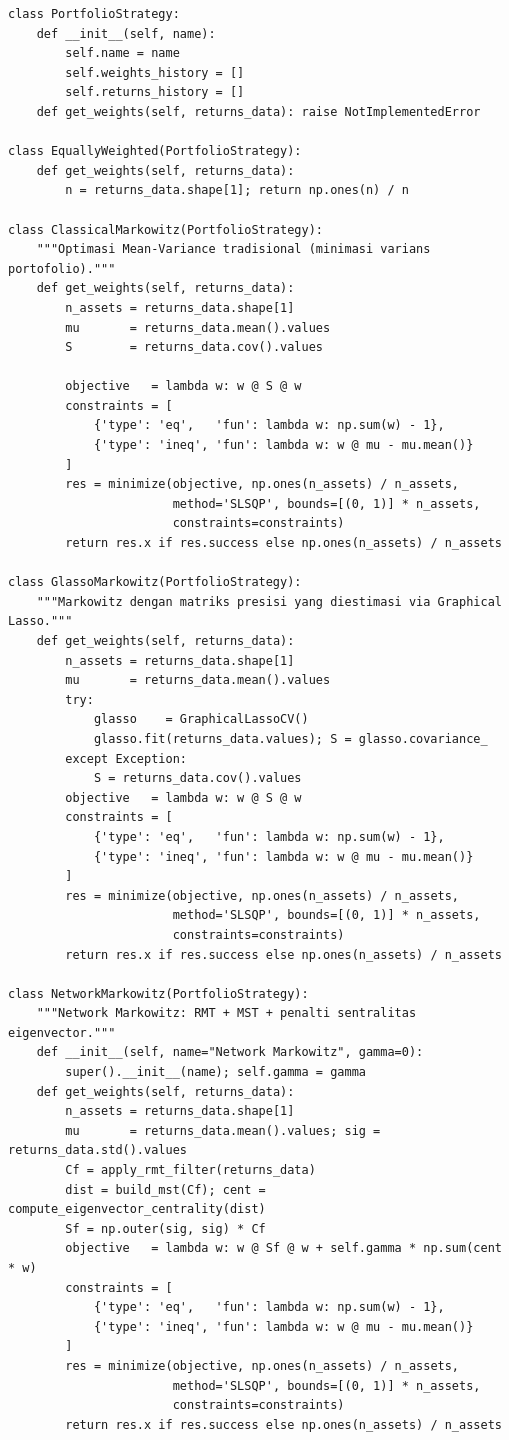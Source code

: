 \documentclass[12pt,a4paper]{article}
\begin{document}
\begin{lstlisting}[caption={Kelas-kelas strategi portofolio}]
class PortfolioStrategy:
    def __init__(self, name):
        self.name = name
        self.weights_history = []
        self.returns_history = []
    def get_weights(self, returns_data): raise NotImplementedError

class EquallyWeighted(PortfolioStrategy):
    def get_weights(self, returns_data):
        n = returns_data.shape[1]; return np.ones(n) / n

class ClassicalMarkowitz(PortfolioStrategy):
    """Optimasi Mean-Variance tradisional (minimasi varians portofolio)."""
    def get_weights(self, returns_data):
        n_assets = returns_data.shape[1]
        mu       = returns_data.mean().values
        S        = returns_data.cov().values

        objective   = lambda w: w @ S @ w
        constraints = [
            {'type': 'eq',   'fun': lambda w: np.sum(w) - 1},
            {'type': 'ineq', 'fun': lambda w: w @ mu - mu.mean()}
        ]
        res = minimize(objective, np.ones(n_assets) / n_assets,
                       method='SLSQP', bounds=[(0, 1)] * n_assets,
                       constraints=constraints)
        return res.x if res.success else np.ones(n_assets) / n_assets

class GlassoMarkowitz(PortfolioStrategy):
    """Markowitz dengan matriks presisi yang diestimasi via Graphical Lasso."""
    def get_weights(self, returns_data):
        n_assets = returns_data.shape[1]
        mu       = returns_data.mean().values
        try:
            glasso    = GraphicalLassoCV()
            glasso.fit(returns_data.values); S = glasso.covariance_
        except Exception:
            S = returns_data.cov().values
        objective   = lambda w: w @ S @ w
        constraints = [
            {'type': 'eq',   'fun': lambda w: np.sum(w) - 1},
            {'type': 'ineq', 'fun': lambda w: w @ mu - mu.mean()}
        ]
        res = minimize(objective, np.ones(n_assets) / n_assets,
                       method='SLSQP', bounds=[(0, 1)] * n_assets,
                       constraints=constraints)
        return res.x if res.success else np.ones(n_assets) / n_assets

class NetworkMarkowitz(PortfolioStrategy):
    """Network Markowitz: RMT + MST + penalti sentralitas eigenvector."""
    def __init__(self, name="Network Markowitz", gamma=0):
        super().__init__(name); self.gamma = gamma
    def get_weights(self, returns_data):
        n_assets = returns_data.shape[1]
        mu       = returns_data.mean().values; sig = returns_data.std().values
        Cf = apply_rmt_filter(returns_data)
        dist = build_mst(Cf); cent = compute_eigenvector_centrality(dist)
        Sf = np.outer(sig, sig) * Cf
        objective   = lambda w: w @ Sf @ w + self.gamma * np.sum(cent * w)
        constraints = [
            {'type': 'eq',   'fun': lambda w: np.sum(w) - 1},
            {'type': 'ineq', 'fun': lambda w: w @ mu - mu.mean()}
        ]
        res = minimize(objective, np.ones(n_assets) / n_assets,
                       method='SLSQP', bounds=[(0, 1)] * n_assets,
                       constraints=constraints)
        return res.x if res.success else np.ones(n_assets) / n_assets


\end{lstlisting}
\end{document}
